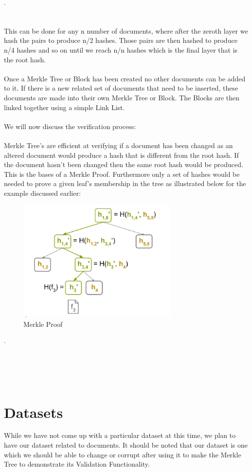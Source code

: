 \documentclass{article}
\begin{document}
.
\\\\\\
This can be done for any n number of documents, where after the zeroth layer we hash the pairs to produce n/2 hashes. Those pairs are then hashed to produce n/4 hashes and so on until we reach n/n hashes which is the final layer that is the root hash.
\\\\
Once a Merkle Tree or Block has been created no other documents can be added to it. If there is a new related set of documents that need to be inserted, these documents are made into their own Merkle Tree or Block. The Blocks are then linked together using a simple Link List.
\\\\
We will now discuss the verification process:
\\\\
Merkle Tree's are efficient at verifying if a document has been changed as an altered document would produce a hash that is different from the root hash. If the document hasn't been changed then the same root hash would be produced. This is the bases of a Merkle Proof. Furthermore only a set of hashes would be needed to prove a given leaf's membership in the tree as illustrated below for the example discussed earlier:

\begin{figure}[htp]
    \centering
    \includegraphics[width=8cm]{Merkle Proof}
    \caption{Merkle Proof}
    \label{fig:f4}
\end{figure}
.
\\\\\\\\\\
\section{Datasets}
While we have not come up with a particular dataset at this time, we plan to have our dataset related to documents. It should be noted that our dataset is one which we should be able to change or corrupt after using it to make the Merkle Tree to demonstrate its Validation Functionality.
\newpage
\end{document}
